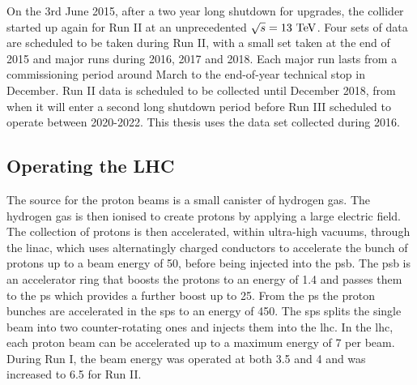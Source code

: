 On the 3rd June 2015, after a two year long shutdown for upgrades, the collider started up again for Run II at an unprecedented $\sqrt{s}=13\mathrm{~Te\hspace{-.08em}V}^{}$. 
Four sets of data are scheduled to be taken during Run II, with a small set taken at the end of 2015 and major runs during 2016, 2017 and 2018.
Each major run lasts from a commissioning period around March to the end-of-year technical stop in December.
Run II data is scheduled to be collected until December 2018, from when it will enter a second long shutdown period before Run III scheduled to operate between 2020-2022.
This thesis uses the data set collected during 2016.

\subsection{Operating the LHC}
\label{ssec:LHCoperation}

The source for the proton beams is a small canister of hydrogen gas. 
The hydrogen gas is then ionised to create protons by applying a large electric field.
The collection of protons is then accelerated, within ultra-high vacuums, through the \acrfull{linac}, which uses alternatingly charged conductors to accelerate the bunch of protons up to a beam energy of 50\MeV{}, before being injected into the \acrfull{psb}.
The \acrshort{psb} is an accelerator ring that boosts the protons to an energy of 1.4\GeV{} and passes them to the \acrfull{ps} which provides a further boost up to 25\GeV{}.
From the \acrshort{ps} the proton bunches are accelerated in the \acrfull{sps} to an energy of 450\GeV{}. 
The \acrshort{sps} splits the single beam into two counter-rotating ones and injects them into the \acrshort{lhc}.
In the \acrshort{lhc}, each proton beam can be accelerated up to a maximum energy of 7\TeV{} per beam. 
During Run I, the beam energy was operated at both 3.5 and 4\TeV{} and was increased to 6.5\TeV{} for Run II. 

